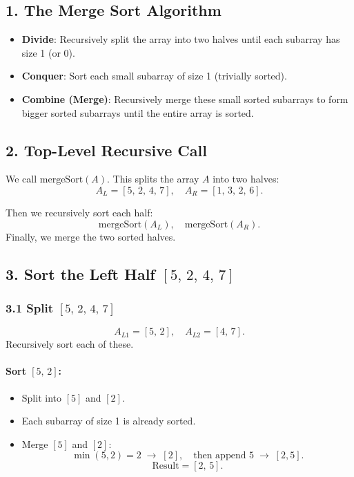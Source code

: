 \documentclass{article}
\theoremstyle{remark}
\begin{document}
\subsection*{1. The Merge Sort Algorithm}
\begin{itemize}
    \item \textbf{Divide}: Recursively split the array into two halves until each subarray has size 1 (or 0).
    \item \textbf{Conquer}: Sort each small subarray of size 1 (trivially sorted).
    \item \textbf{Combine (Merge)}: Recursively merge these small sorted subarrays to form bigger sorted subarrays until the entire array is sorted.
\end{itemize}

\subsection*{2. Top-Level Recursive Call}

We call \(\text{mergeSort}(A)\). This splits the array \(A\) into two halves:
\[
A_L = [5,\, 2,\, 4,\, 7], \quad
A_R = [1,\, 3,\, 2,\, 6].
\]

Then we recursively sort each half:
\[
\text{mergeSort}(A_L), \quad \text{mergeSort}(A_R).
\]
Finally, we merge the two sorted halves.

\subsection*{3. Sort the Left Half \([5,\,2,\,4,\,7]\)}

\subsubsection*{3.1 Split \([5,\,2,\,4,\,7]\)}
\[
A_{L1} = [5,\,2], \quad
A_{L2} = [4,\,7].
\]
Recursively sort each of these.

\paragraph{Sort \([5,\,2]\):}
\begin{itemize}
    \item Split into \([5]\) and \([2]\).
    \item Each subarray of size 1 is already sorted.
    \item Merge \([5]\) and \([2]\):
    \[
        \min(5,2) = 2 \;\rightarrow\; [2],
        \quad \text{then append } 5 \;\rightarrow\; [2,5].
    \]
    \[
        \text{Result} = [2,\,5].
    \]
\end{itemize}
\end{document}
